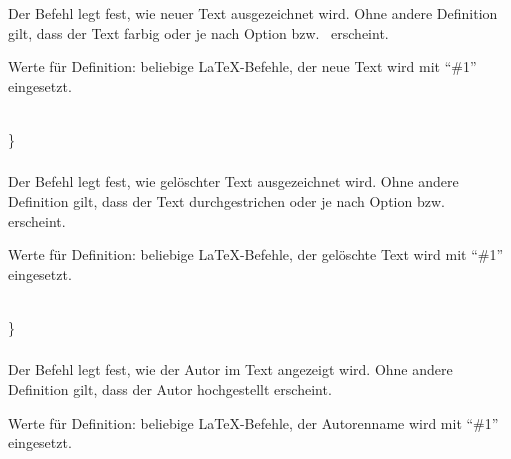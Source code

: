 \subsubsection{}
\DescribeMacro{\setaddedmarkup}

Der Befehl  legt fest, wie neuer Text ausgezeichnet wird.
Ohne andere Definition gilt, dass der Text farbig oder je nach Option  bzw.\  erscheint.

Werte für Definition: beliebige \LaTeX-Befehle, der neue Text wird mit "`\#1"' eingesetzt.
\begin{chusage}
		\>\\
	\usageexample
		\>\}\\
		\>
\end{chusage}

\subsubsection{}
\DescribeMacro{\setdeletedmarkup}

Der Befehl  legt fest, wie gelöschter Text ausgezeichnet wird.
Ohne andere Definition gilt, dass der Text durchgestrichen oder je nach Option  bzw.\  erscheint.

Werte für Definition: beliebige \LaTeX-Befehle, der gelöschte Text wird mit "`\#1"' eingesetzt.
\begin{chusage}
		\>\\
	\usageexample
		\>\}\\
		\>
\end{chusage}

\subsubsection{}
\DescribeMacro{\setauthormarkup}

Der Befehl  legt fest, wie der Autor im Text angezeigt wird.
Ohne andere Definition gilt, dass der Autor hochgestellt erscheint.

Werte für Definition: beliebige \LaTeX-Befehle, der Autorenname wird mit "`\#1"' eingesetzt.
\begin{chusage}
		\>\\
	\usageexample
		\>\\
		\>\\
		\>
\end{chusage}

